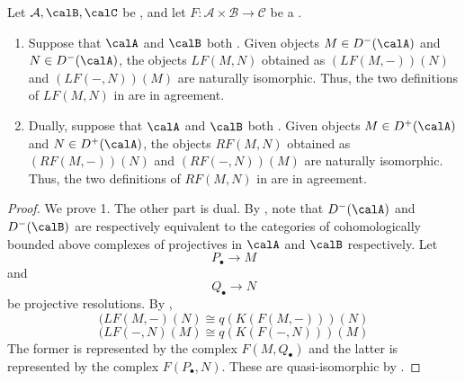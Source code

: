 \begin{proposition} \label{proposition:total_derived_functors_for_biadditive_functors_on_abelian_categories_are_well_defined_if_both_source_categories_have_enough_projectives_injectives}
    Let $\mathcal{A}, \calB, \calC$ be , and let $F: \mathcal{A} \times \mathcal{B} \to \mathcal{C}$ be a . 
    \begin{enumerate}
        \item Suppose that $\calA$ and $\calB$ both . Given objects $M \in D^-(\calA)$ and $N \in D^-(\calA)$, the objects $LF(M,N)$ obtained as $(LF(M,-))(N)$ and $(LF(-,N))(M)$ are naturally isomorphic. Thus, the two definitions of $LF(M,N)$ in  are in agreement.
        \item Dually, suppose that $\calA$ and $\calB$ both . Given objects $M \in D^+(\calA)$ and $N \in D^+(\calA)$, the objects $RF(M,N)$ obtained as $(RF(M,-))(N)$ and $(RF(-,N))(M)$ are naturally isomorphic. Thus, the two definitions of $RF(M,N)$ in  are in agreement.
    \end{enumerate}
\end{proposition}
\begin{proof}
    We prove 1. The other part is dual. By , note that $D^-(\calA)$ and $D^-(\calB)$ are respectively equivalent to the categories  of cohomologically bounded above complexes of projectives in $\calA$ and $\calB$ respectively. Let 
    $$P_\bullet \to M$$
    and 
    $$Q_\bullet \to N$$
    be projective resolutions.
    By , 
    $$(LF(M,-)(N) \cong q(K(F(M,-)))(N)$$
    $$(LF(-,N)(M) \cong q(K(F(-,N)))(M)$$
    The former is represented by the complex $F(M,Q_\bullet)$ and the latter is represented by the complex $F(P_\bullet, N)$. These are quasi-isomorphic by .
\end{proof}
